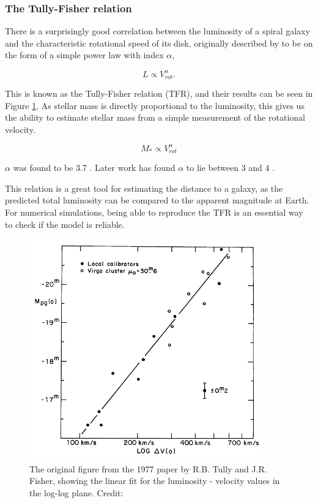 \subsubsection{The Tully-Fisher relation}

There is a surprisingly good correlation between the luminosity of a spiral galaxy and the characteristic rotational speed of its disk, originally described by \textcite{TullyFisher1977} to be on the form of a simple power law with index $\alpha$,

\begin{equation}
    L \propto V_{rot}^\alpha.
\end{equation}

This is known as the Tully-Fisher relation (TFR), and their results can be seen in Figure \ref{tully_fisher}. As stellar mass is directly proportional to the luminosity, this gives us the ability to estimate stellar mass from a simple measurement of the rotational velocity.

\begin{equation}
    M_* \propto V_{rot}^\alpha 
\end{equation}

$\alpha$ was found to be 3.7 \parencite{TullyFisher1977}. Later work has found $\alpha$ to lie between 3 and 4 \parencite{Lelli2019, Bloom2017}.

This relation is a great tool for estimating the distance to a galaxy, as the predicted total luminosity can be compared to the apparent magnitude at Earth. For numerical simulations, being able to reproduce the TFR is an essential way to check if the model is reliable.

\begin{figure}
    \centering
    \includegraphics[width=0.9\textwidth]{images/tully_fisher.png}
    \caption{The original figure from the 1977 paper by R.B. Tully and J.R. Fisher, showing the linear fit for the luminosity - velocity values in the log-log plane. Credit: \textcite{TullyFisher1977}}
    \label{tully_fisher}
\end{figure}

